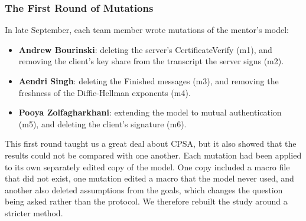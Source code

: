 \documentclass[11pt]{article}
\begin{document}
\subsubsection{The First Round of Mutations}
In late September, each team member wrote mutations of the mentor's model:
\begin{itemize}
    \item \textbf{Andrew Bourinski}: deleting the server's CertificateVerify (m1), and removing the client's key share from the transcript the server signs (m2).
    \item \textbf{Aendri Singh}: deleting the Finished messages (m3), and removing the freshness of the Diffie-Hellman exponents (m4).
    \item \textbf{Pooya Zolfagharkhani}: extending the model to mutual authentication (m5), and deleting the client's signature (m6).
\end{itemize}
This first round taught us a great deal about CPSA, but it also showed that the results could not be compared with one another. Each mutation had been applied to its own separately edited copy of the model. One copy included a macro file that did not exist, one mutation edited a macro that the model never used, and another also deleted assumptions from the goals, which changes the question being asked rather than the protocol. We therefore rebuilt the study around a stricter method.
\end{document}
